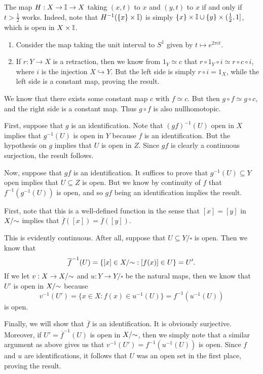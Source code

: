 \documentclass[../../solutions.tex]{subfiles}
\begin{document}
\begin{exercise} \leavevmode
The map $H:X\to\mathbb I\to X$ taking $(x,t)$ to $x$ and $(y,t)$ to $x$ if and only if $t>\frac12$ works. Indeed, note that $H^{-1}(\{x\}\times\mathbb I)$ is simply $\{x\}\times\mathbb I\cup\{y\}\times(\frac12,1]$, which is open in $X\times\mathbb I$. 
\end{exercise} 

\begin{exercise} \leavevmode
\begin{enumerate}
\item Consider the map taking the unit interval to $S^1$ given by $t\mapsto e^{2\pi it}$. 

\item If $r:Y\to X$ is a retraction, then we know from $1_Y\simeq c$ that $r\circ1_Y\circ i\simeq r\circ c\circ i$, where $i$ is the injection $X\hookrightarrow Y$. But the left side is simply $r\circ i=1_X$, while the left side is a constant map, proving the result. 
\end{enumerate} 
\end{exercise} 

\begin{exercise} \leavevmode
We know that there exists some constant map $c$ with $f\simeq c$. But then $g\circ f\simeq g\circ c$, and the right side is a constant map. Thus $g\circ f$ is also nullhomotopic. 
\end{exercise} 

\begin{exercise} \leavevmode
First, suppose that $g$ is an identification. Note that $(gf)^{-1}(U)$ open in $X$ implies that $g^{-1}(U)$ is open in $Y$ because $f$ is an identification. But the hypothesis on $g$ implies that $U$ is open in $Z$. Since $gf$ is clearly a continuous surjection, the result follows. 

Now, suppose that $gf$ is an identification. It suffices to prove that $g^{-1}(U)\subseteq Y$ open implies that $U\subseteq Z$ is open. But we know by continuity of $f$ that $f^{-1}(g^{-1}(U))$ is open, and so $gf$ being an identification implies the result. 
\end{exercise} 

\begin{exercise} \leavevmode
First, note that this is a well-defined function in the sense that $[x]=[y]$ in $X/{\sim}$ implies that $\overline f([x])=\overline f([y])$. 

This is evidently continuous. After all, suppose that $U\subseteq Y/\square$ is open. Then we know that \[\overline f^{-1}(U)=\{[x]\in X/{\sim}:[f(x)]\in U\}=U'.\] If we let $v:X\to X/{\sim}$ and $u:Y\to Y/\square$ be the natural maps, then we know that $U'$ is open in $X/{\sim}$ because \[v^{-1}(U')=\{x\in X:f(x)\in u^{-1}(U)\}=f^{-1}(u^{-1}(U))\] is open. 

Finally, we will show that $\overline f$ is an identification. It is obviously surjective. Moreover, if $U'=\overline f^{-1}(U)$ is open in $X/{\sim}$, then we simply note that a similar argument as above gives us that $v^{-1}(U')=f^{-1}(u^{-1}(U))$ is open. Since $f$ and $u$ are identifications, it follows that $U$ was an open set in the first place, proving the result. 
\end{exercise} 
\end{document}
